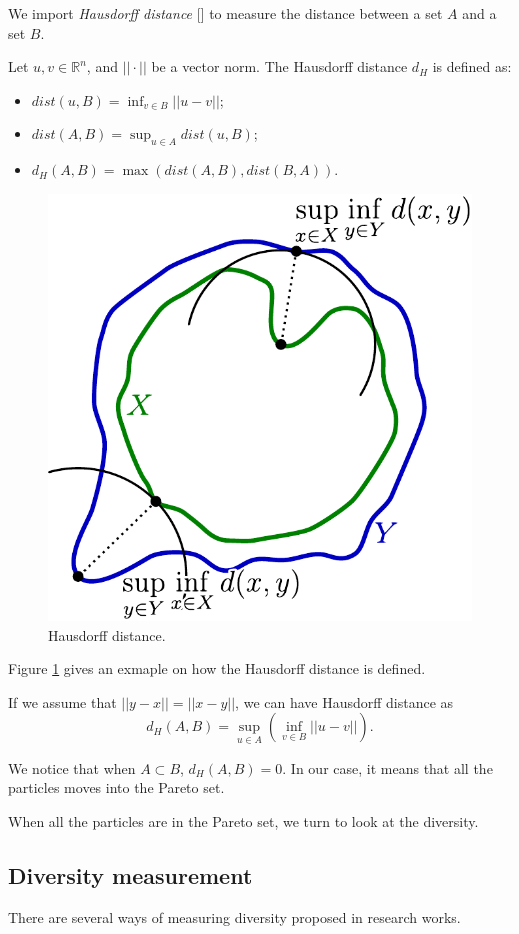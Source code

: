 \documentclass[12pt]{article}
\begin{document}
We import \emph{Hausdorff distance} [\cite{schutze2012using}] to measure the distance between a set $ A $ and a set $ B $.
\begin{mydef}
\label{def:haus_dist}
Let $ u, v \in \mathbb{R}^{n} $, and $ || \cdot || $ be a vector norm.
The Hausdorff distance $ d_{H} $ is defined as:
\begin{itemize}
\item $ dist(u, B) = \inf_{v \in B} || u - v ||  $;
\item $ dist(A, B) = \sup_{u \in A} dist(u, B) $;
\item $ d_{H} (A, B) = \max (dist(A,B), dist(B,A)) $.
\end{itemize}
\end{mydef}

\begin{figure}
\centering
\includegraphics[width=0.3\linewidth]{./images/hausdorff_distance}
\caption{Hausdorff distance.}
\label{fig:hausdorff_distance}
\end{figure}

Figure \ref{fig:hausdorff_distance} gives an exmaple on how the Hausdorff distance is defined.

If we assume that $ || y - x || = || x - y || $, we can have Hausdorff distance as
\begin{equation}
\label{eq:simp_haus_dist}
d_{H} (A, B) = \sup_{u \in A} \left( \inf_{v \in B} || u - v || \right).
\end{equation} 

We notice that when $ A \subset B $, $ d_{H}(A, B) = 0 $.
In our case, it means that all the particles moves into the Pareto set.

When all the particles are in the Pareto set, we turn to look at the diversity.

\subsection{Diversity measurement}

There are several ways of measuring diversity proposed in research works. 
\end{document}
